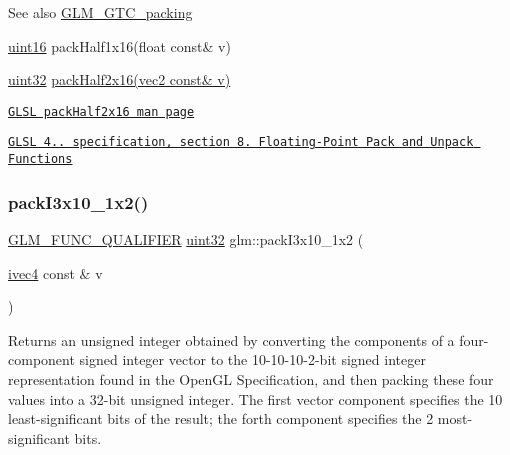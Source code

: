 \begin{DoxySeeAlso}{See also}
\hyperlink{group__gtc__packing}{G\+L\+M\+\_\+\+G\+T\+C\+\_\+packing} 

\hyperlink{group__gtc__type__precision_gad8c2939e1fdd8e5828b31d95c52255d5}{uint16} pack\+Half1x16(float const\& v) 

\hyperlink{group__gtc__type__precision_ga202b6a53c105fcb7e531f9b443518451}{uint32} \hyperlink{group__core__func__packing_ga20f134b07db3a3d3a38efb2617388c92}{pack\+Half2x16(vec2 const\& v)} 

\href{http://www.opengl.org/sdk/docs/manglsl/xhtml/packHalf2x16.xml}{\tt G\+L\+SL pack\+Half2x16 man page} 

\href{http://www.opengl.org/registry/doc/GLSLangSpec.4.20.8.pdf}{\tt G\+L\+SL 4.. specification, section 8. Floating-\/\+Point Pack and Unpack Functions} 
\end{DoxySeeAlso}
\mbox{\label{group__gtc__packing_ga032e18fa5bc5b8f3897104aeb2f1e195}} 
\subsubsection{\texorpdfstring{pack\+I3x10\+\_\+1x2()}{packI3x10\_1x2()}}
{\footnotesize\ttfamily \hyperlink{setup_8hpp_a33fdea6f91c5f834105f7415e2a64407}{G\+L\+M\+\_\+\+F\+U\+N\+C\+\_\+\+Q\+U\+A\+L\+I\+F\+I\+ER} \hyperlink{group__gtc__type__precision_ga202b6a53c105fcb7e531f9b443518451}{uint32} glm\+::pack\+I3x10\+\_\+1x2 (\begin{DoxyParamCaption}\item[{\hyperlink{group__core__types_gaa4560ddc50320ea8f8a70d5c9c249fea}{ivec4} const \&}]{v }\end{DoxyParamCaption})}

Returns an unsigned integer obtained by converting the components of a four-\/component signed integer vector to the 10-\/10-\/10-\/2-\/bit signed integer representation found in the Open\+GL Specification, and then packing these four values into a 32-\/bit unsigned integer. The first vector component specifies the 10 least-\/significant bits of the result; the forth component specifies the 2 most-\/significant bits.

